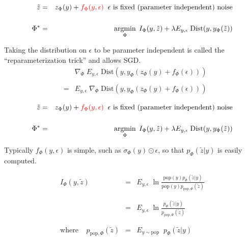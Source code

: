 {

\bigskip
\bigskip
\begin{eqnarray*}
\tilde{z} & = & z_\Phi(y) + {\color{red} f_\Phi(y,\epsilon)} \;\;\mbox{$\epsilon$ is fixed (parameter independent) noise} \\
\\
\Phi^* & = & \operatorname*{argmin}_\Phi \;I_\Phi(y,\tilde{z}) + \lambda E_{y,\epsilon}\; \mathrm{Dist}(y,y_\Phi(\tilde{z}))
\end{eqnarray*}

\vfill
Taking the distribution on $\epsilon$ to be parameter independent is called the ``reparameterization trick'' and allows SGD.
\begin{eqnarray*}
& & \nabla_\Phi \;E_{y,\epsilon}\; \mathrm{Dist}(y,y_\Phi(z_\Phi(y) + f_\Phi(\epsilon))) \\
\\
& = & E_{y,\epsilon}\; \nabla_\Phi\;\mathrm{Dist}(y,y_\Phi(z_\Phi(y) + f_\Phi(\epsilon)))
\end{eqnarray*}


\bigskip
\bigskip
\begin{eqnarray*}
\tilde{z} & = & z_\Phi(y) + {\color{red} f_\Phi(y,\epsilon)} \;\;\mbox{$\epsilon$ is fixed (parameter independent) noise} \\
\\
\Phi^* & = & \operatorname*{argmin}_\Phi \;I_\Phi(y,\tilde{z}) + \lambda E_{y,\epsilon}\; \mathrm{Dist}(y,y_\Phi(\tilde{z}))
\end{eqnarray*}

\vfill
Typically $f_\Phi(y,\epsilon)$ is simple, such as $\sigma_\Phi(y)\odot \epsilon$, so that {\color{red} $p_\Phi(\tilde{z}|y)$ is easily computed.}


\begin{eqnarray*}
I_\Phi(y,\tilde{z})  & = & E_{y,\epsilon}\; \ln \frac{\mathrm{pop}(y)p_\Phi(\tilde{z}|y)}{\mathrm{pop}(y)p_{\mathrm{pop},\Phi}(\tilde{z})} \\
\\
\\
& = & E_{y,\epsilon}\;\ln \frac{p_\Phi(\tilde{z}|y)}{p_{\mathrm{pop},\Phi}(\tilde{z})} \\
\\
\\
\mathrm{where}\;\;\;\;p_{\mathrm{pop},\Phi}(\tilde{z}) & = & E_{y\sim \mathrm{pop}}\;\;p_\Phi(\tilde{z}|y)
\end{eqnarray*}

}
